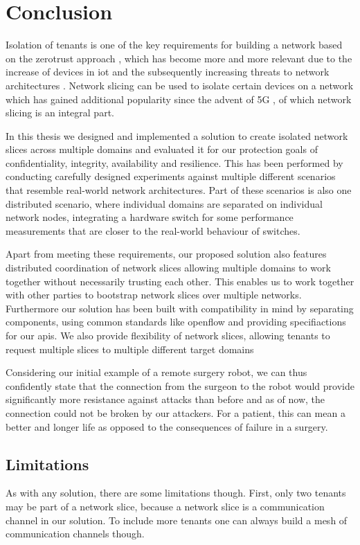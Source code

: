 \chapter{Conclusion}
\label{conclusion}

Isolation of tenants is one of the key requirements for building a network based on the \gls{zerotrust} approach \cite{zerotrust}, which has become more and more relevant due to the increase of devices in \acrshort{iot} \cite{iotincrease} and the subsequently increasing threats to network architectures \cite{iotthreats}. Network slicing can be used to isolate certain devices on a network which has gained additional popularity since the advent of 5G \cite{5G1, 5G2, 5G3}, of which network slicing is an integral part.

In this thesis we designed and implemented a solution to create isolated network slices across multiple domains and evaluated it for our protection goals of confidentiality, integrity, availability and resilience. This has been performed by conducting carefully designed experiments against multiple different scenarios that resemble real-world network architectures. Part of these scenarios is also one distributed scenario, where individual domains are separated on individual network nodes, integrating a hardware switch for some performance measurements that are closer to the real-world behaviour of switches.

Apart from meeting these requirements, our proposed solution also features distributed coordination of network slices allowing multiple domains to work together without necessarily trusting each other. This enables us to work together with other parties to bootstrap network slices over multiple networks. Furthermore our solution has been built with compatibility in mind by separating components, using common standards like \Gls{openflow} and providing specifiactions for our \acrshort{api}s. We also provide flexibility of network slices, allowing tenants to request multiple slices to multiple different target domains

Considering our initial example of a remote surgery robot, we can thus confidently state that the connection from the surgeon to the robot would provide significantly more resistance against attacks than before and as of now, the connection could not be broken by our attackers. For a patient, this can mean a better and longer life as opposed to the consequences of failure in a surgery.


\section{Limitations}
As with any solution, there are some limitations though. First, only two tenants may be part of a network slice, because a network slice is a communication channel in our solution. To include more tenants one can always build a mesh of communication channels though.

